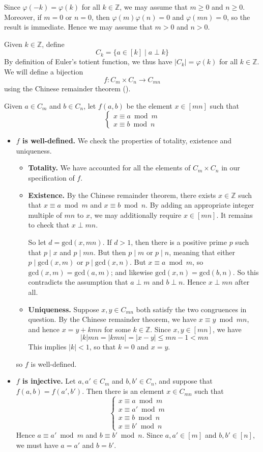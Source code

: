 \begin{cproof}
Since $\varphi(-k)=\varphi(k)$ for all $k \in \mathbb{Z}$, we may assume that $m \ge 0$ and $n \ge 0$. Moreover, if $m=0$ or $n=0$, then $\varphi(m)\varphi(n)=0$ and $\varphi(mn)=0$, so the result is immediate. Hence we may assume that $m>0$ and $n>0$.

Given $k \in \mathbb{Z}$, define
\[ C_k = \{ a \in [k] \mid a \perp k \} \]
By definition of Euler's totient function, we thus have $|C_k| = \varphi(k)$ for all $k \in \mathbb{Z}$. We will define a bijection
\[ f : C_m \times C_n \to C_{mn} \]
using the Chinese remainder theorem ().

Given $a \in C_m$ and $b \in C_n$, let $f(a, b)$ be the element $x \in [mn]$ such that
\[ \begin{cases} x \equiv a \bmod m \\ x \equiv b \bmod n \end{cases} \]
\begin{itemize}
\item \textbf{$f$ is well-defined.} We check the properties of totality, existence and uniqueness.
\begin{itemize}
\item \textbf{Totality.} We have accounted for all the elements of $C_m \times C_n$ in our specification of $f$.
\item \textbf{Existence.} By the Chinese remainder theorem, there exists $x \in \mathbb{Z}$ such that $x \equiv a \bmod m$ and $x \equiv b \bmod n$. By adding an appropriate integer multiple of $mn$ to $x$, we may additionally require $x \in [mn]$. It remains to check that $x \perp mn$.

So let $d=\mathrm{gcd}(x,mn)$. If $d>1$, then there is a positive prime $p$ such that $p \mid x$ and $p \mid mn$. But then $p \mid m$ or $p \mid n$, meaning that either $p \mid \mathrm{gcd}(x,m)$ or $p \mid \mathrm{gcd}(x,n)$. But $x \equiv a \bmod m$, so $\mathrm{gcd}(x,m) = \mathrm{gcd}(a,m)$; and likewise $\mathrm{gcd}(x,n) = \mathrm{gcd}(b,n)$. So this contradicts the assumption that $a \perp m$ and $b \perp n$. Hence $x \perp mn$ after all.
\item \textbf{Uniqueness.} Suppose $x,y \in C_{mn}$ both satisfy the two congruences in question. By the Chinese remainder theorem, we have $x \equiv y \bmod mn$, and hence $x=y+kmn$ for some $k \in \mathbb{Z}$. Since $x,y \in [mn]$, we have
\[ |k|mn = |kmn| = |x-y| \le mn-1 < mn \]
This implies $|k| < 1$, so that $k=0$ and $x=y$.
\end{itemize}
so $f$ is well-defined.
\item \textbf{$f$ is injective.} Let $a,a' \in C_m$ and $b,b' \in C_n$, and suppose that $f(a,b)=f(a',b')$. Then there is an element $x \in C_{mn}$ such that
\[ \begin{cases} x \equiv a \bmod m \\ x \equiv a' \bmod m \\ x \equiv b \bmod n \\ x \equiv b' \bmod n \end{cases} \]
Hence $a \equiv a' \bmod m$ and $b \equiv b' \bmod n$. Since $a,a' \in [m]$ and $b,b' \in [n]$, we must have $a=a'$ and $b=b'$.


\end{itemize}
\end{cproof}
